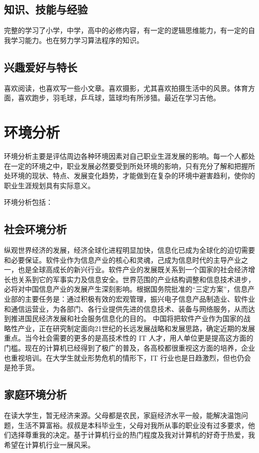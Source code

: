 \documentclass{article}
\begin{document}
\subsection{知识、技能与经验}
完整的学习了小学，中学，高中的必修内容，有一定的逻辑思维能力，有一定的自我学习能力。也在努力学习算法程序的知识。\par
\subsection{兴趣爱好与特长}
喜欢阅读，也喜欢写一些小文章。喜欢摄影，尤其喜欢拍摄生活中的风景。体育方面，喜欢跑步，羽毛球，乒乓球，篮球均有所涉猎。最近在学习吉他。\par
\section{环境分析}
环境分析主要是评估周边各种环境因素对自己职业生涯发展的影响。每一个人都处在一定的环境之中，职业发展必然要受到所处环境的影响，只有充分了解和把握所处环境的现状、特点、发展变化趋势，才能做到在复杂的环境中避害趋利，使你的职业生涯规划具有实际意义。\par
环境分析包括：\par
\subsection{社会环境分析}
 纵观世界经济的发展，经济全球化进程明显加快，信息化已成为全球化的迫切需要和必要保证。软件业作为信息产业的核心和灵魂，己成为信息时代的主导产业之一，也是全球高成长的新兴行业。软件产业的发展既关系到一个国家的社会经济增长也关系到它的军事实力及信息安全。世界范围的产业结构调整和信息技术进步，必将对中国信息产业的发展产生深刻影响。根据国务院批准的“三定方案”，信息产业部的主要任务是：通过积极有效的宏观管理，振兴电子信息产品制造业、软件业和通信运营业，为各部门、各行业提供先进的信息技术、装备与网络服务，从而达到推进国民经济发展和社会服务信息化的目的。 中国将把软件产业作为国家的战略性产业，正在研究制定面向21世纪的长远发展战略和发展思路，确定近期的发展重点。当今社会需要的更多的是高技术性的 IT 人才，用人单位更是提高这方面的门槛。现在的计算机已经得到了极广的普及，各高校都很重视这方面的培养，企业也重视培训。在大学生就业形势危机的情形下，IT 行业也是日趋激烈，但也仍会是抢手货。\par
\subsection{家庭环境分析}
在读大学生，暂无经济来源。父母都是农民，家庭经济水平一般，能解决温饱问题，生活不算富裕。叔叔是本科毕业生，父母对我所从事的职业没有过多要求，他们选择尊重我的决定。基于计算机行业的热门程度及我对计算机的好奇于热爱，我希望在计算机行业一展风采。\par
\end{document}
